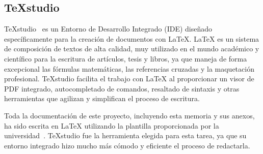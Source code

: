 \subsection{\TeX{}studio}


\TeX{}studio~\cite{texstudio} es un Entorno de Desarrollo Integrado (IDE) diseñado específicamente para la creación de documentos con \LaTeX{}. \LaTeX{} es un sistema de composición de textos de alta calidad, muy utilizado en el mundo académico y científico para la escritura de artículos, tesis y libros, ya que maneja de forma excepcional las fórmulas matemáticas, las referencias cruzadas y la maquetación profesional. \TeX{}studio facilita el trabajo con \LaTeX{} al proporcionar un visor de PDF integrado, autocompletado de comandos, resaltado de sintaxis y otras herramientas que agilizan y simplifican el proceso de escritura.

Toda la documentación de este proyecto, incluyendo esta memoria y sus anexos, ha sido escrita en \LaTeX{} utilizando la plantilla proporcionada por la universidad~\cite{UBU2024ubutfgm}. \TeX{}studio fue la herramienta elegida para esta tarea, ya que su entorno integrado hizo mucho más cómodo y eficiente el proceso de redactarla.
